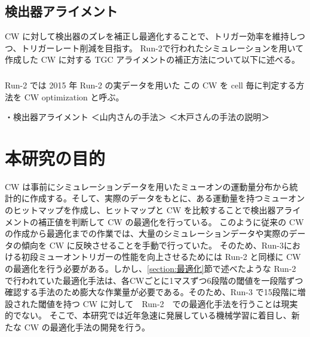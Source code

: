 \subsection{検出器アライメント}
CW に対して検出器のズレを補正し最適化することで、トリガー効率を維持しつつ、トリガーレート削減を目指す。
Run-2で行われたシミュレーションを用いて作成した CW に対する TGC アライメントの補正方法について以下に述べる。

\subsubsection{}

\subsubsection{}
Run-2 では
2015 年 Run-2 の実データを用いた
この CW を cell 毎に判定する方法を CW optimization と呼ぶ。


・検出器アライメント
＜山内さんの手法＞
＜木戸さんの手法の説明＞


\section{本研究の目的}
CW は事前にシミュレーションデータを用いたミューオンの運動量分布から統計的に作成する。そして、実際のデータをもとに、ある運動量を持つミューオンのヒットマップを作成し、ヒットマップと CW を比較することで検出器アライメントの補正値を判断して CW の最適化を行っている。
このように従来の CW の作成から最適化までの作業では、大量のシミュレーションデータや実際のデータの傾向を CW に反映させることを手動で行っていた。
そのため、Run-3における初段ミューオントリガーの性能を向上させるためには Run-2 と同様に CW の最適化を行う必要がある。しかし、\ref{section:最適化}節で述べたような Run-2 で行われていた最適化手法は、各CWごとに1マスずつ6段階の閾値を一段階ずつ確認する手法のため膨大な作業量が必要である。そのため、Run-3 で15段階に増設された閾値を持つ CW に対して　Run-2　での最適化手法を行うことは現実的でない。
そこで、本研究では近年急速に発展している機械学習に着目し、新たな CW の最適化手法の開発を行う。















